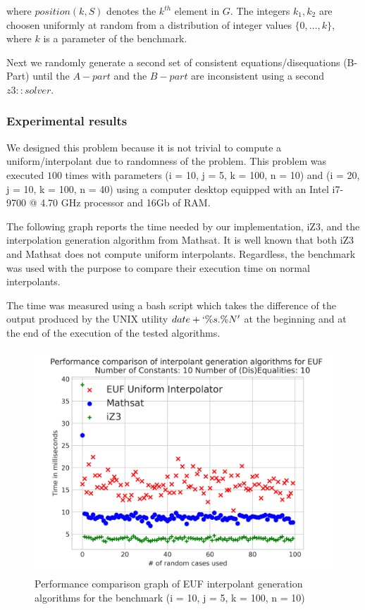 where $position(k, S)$ denotes the $k^{th}$ element in $G$. The 
integers $k_1, k_2$ are choosen uniformly at random from a
distribution of integer values $\{0, \dots, k\}$, 
where $k$ is a parameter of the benchmark.

Next we randomly generate a second set of consistent 
equations/disequations (B-Part) until the $A-part$ and the
$B-part$ are inconsistent using a second $z3: :solver$.

\subsubsection{Experimental results}

We designed this problem because it is not trivial to 
compute a  uniform/interpolant due to randomness of the
problem. This problem was executed $100$ times
with parameters (i = 10, j = 5, k = 100, n = 10) and 
(i = 20, j = 10, k = 100, n = 40)
using a computer desktop
equipped with an Intel i7-9700 @ 4.70 GHz processor 
and 16Gb of RAM. 

The following graph reports the time needed
by our implementation, iZ3, and the interpolation 
generation algorithm from Mathsat. 
It is well known that both iZ3 and Mathsat does not
compute uniform interpolants. Regardless, the benchmark
was used with the purpose to compare their execution time
on normal interpolants.

The time was
measured using a bash script which takes the difference
of the output produced by the UNIX utility $date +`\%s.\%N'$ 
at the beginning and at the end of the execution of the 
tested algorithms.

\begin{figure}
  \centering
  \includegraphics[scale=0.9]{figures/eufi_performance_graph_10_5_3_10_100}
  \caption{Performance comparison graph of EUF interpolant generation
  algorithms for the benchmark (i = 10, j = 5, k = 100, n = 10)}
  \label{performance_graph_euf}
\end{figure}

